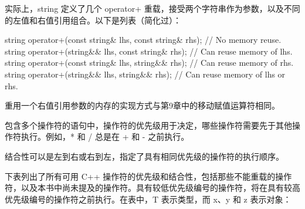 实际上，string 定义了几个 operator+ 重载，接受两个字符串作为参数，以及不同的左值和右值引用组合。以下是列表（简化过）：

\begin{cpp}
string operator+(const string& lhs, const string& rhs); // No memory reuse.
string operator+(string&& lhs, const string& rhs); // Can reuse memory of lhs.
string operator+(const string& lhs, string&& rhs); // Can reuse memory of rhs.
string operator+(string&& lhs, string&& rhs); // Can reuse memory of lhs or rhs.
\end{cpp}

重用一个右值引用参数的内存的实现方式与第9章中的移动赋值运算符相同。


包含多个操作符的语句中，操作符的优先级用于决定，哪些操作符需要先于其他操作符执行。例如，* 和 / 总是在 + 和 - 之前执行。

结合性可以是左到右或右到左，指定了具有相同优先级的操作符的执行顺序。

下表列出了所有可用 C++ 操作符的优先级和结合性，包括那些不能重载的操作符，以及本书中尚未提及的操作符。具有较低优先级编号的操作符，将在具有较高优先级编号的操作符之前执行。在表中，T 表示类型，而 x、y 和 z 表示对象：

